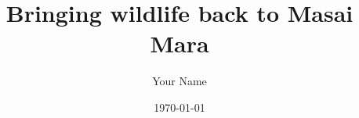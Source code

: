 \usepackage{newtxtext}%
\usepackage{lipsum}
\title{Bringing wildlife back to Masai Mara}
\author{Your Name}
\date{\today}
\usepackage{indentfirst}
\usepackage{multirow}
\usepackage{multicol}
\usepackage{arydshln}
\usepackage{leftidx}
\usepackage{float}
\usepackage{graphicx}
\usepackage{setspace}
\usepackage[shortlabels]{enumitem}
\usepackage{booktabs}
\usepackage{array} 
\newtheorem{thm}{Theorem}[section]
\usepackage{cite}
\usepackage{hyperref}
\usepackage{booktabs}
\usepackage{subfigure}
\renewcommand{\headrulewidth}{0pt}
\pagestyle{fancy}
\fancyhf{} %
